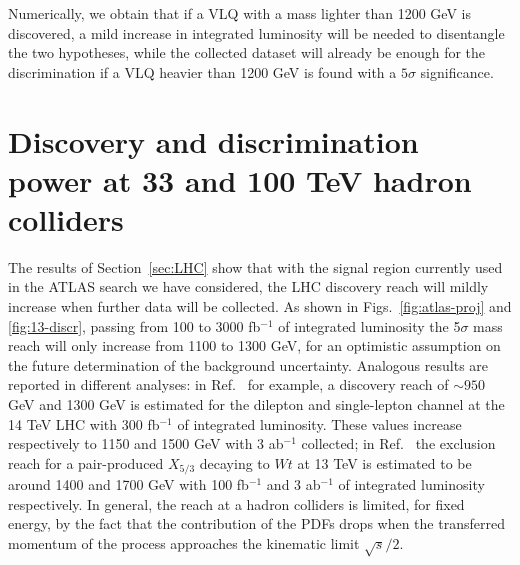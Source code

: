 \documentclass[a4paper]{article}
\begin{document}
Numerically, we obtain that if a VLQ with a mass lighter than 1200 GeV is discovered, a mild increase in integrated luminosity will be needed to disentangle the two hypotheses, while the collected dataset will already be enough for the discrimination if a VLQ heavier than 1200 GeV is found with a $5\sigma$ significance.


\section{Discovery and discrimination power at 33 and 100 TeV hadron colliders}
\label{sec:FCC}

The results of Section~\ref{sec:LHC} show that with the signal region currently used in the ATLAS search we have considered, the LHC discovery reach will mildly increase when further data will be collected. As shown in Figs.~\ref{fig:atlas-proj} and \ref{fig:13-discr}, passing from 100 to 3000 fb$^{-1}$ of integrated luminosity the 5$\sigma$ mass reach will only increase from 1100 to 1300 GeV, for an optimistic assumption on the future determination of the background uncertainty. 
%
Analogous results are reported in different analyses: in Ref.~\cite{CMS:2013xfa} for example, a discovery reach of $\sim950$ GeV and 1300 GeV is estimated for the dilepton and single-lepton channel at the 14 TeV LHC with 300 fb$^{-1}$ of integrated luminosity. These values increase respectively to 1150 and 1500 GeV with 3 ab$^{-1}$ collected; 
%
in Ref.~\cite{Matsedonskyi:2014mna} the exclusion reach for a pair-produced $X_{5/3}$ decaying to $Wt$ at 13 TeV is estimated to be around 1400 and 1700 GeV with 100 fb$^{-1}$ and 3 ab$^{-1}$ of integrated luminosity respectively.
%
In general, the reach at a hadron colliders is limited, for fixed energy, by the fact that the contribution of the PDFs drops when the transferred momentum of the process approaches the kinematic limit $\sqrt{s}/2$.
%
\end{document}
